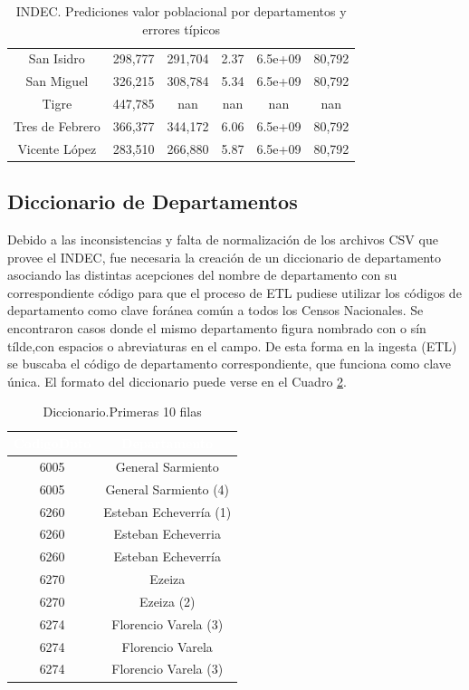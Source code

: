 \documentclass{article}
\theoremstyle{mytheoremstyle}
\theoremstyle{mytheoremstyle}
\theoremstyle{myproblemstyle}
\begin{document}
\begin{table}[htb!]
\begin{tabular}{|c|c|c|c|c|c|}
      San Isidro & 298,777 & 291,704 & 2.37 & 6.5e+09 & 80,792 \\
      San Miguel & 326,215 & 308,784 & 5.34 & 6.5e+09 & 80,792 \\
      Tigre & 447,785 & nan & nan & nan & nan \\
      Tres de Febrero & 366,377 & 344,172 & 6.06 & 6.5e+09 & 80,792 \\
      Vicente López & 283,510 & 266,880 & 5.87 & 6.5e+09 & 80,792 \\
      \hline
      \end{tabular}
      \caption{INDEC. Prediciones valor poblacional por departamentos y errores típicos}
      \label{tab:INResults}
\end{table}
      
\clearpage 
 \subsection{Diccionario de Departamentos } 
Debido a las inconsistencias y falta de normalización de los archivos CSV que provee el INDEC,
 fue necesaria la creación de un diccionario de departamento asociando las distintas acepciones del nombre de
  departamento con su correspondiente código para que el proceso de ETL pudiese utilizar los códigos de departamento 
  como clave foránea común a todos los Censos Nacionales.
  Se encontraron casos donde el mismo departamento figura nombrado con o sín tílde,con espacios o abreviaturas en el campo. \newline
  De esta forma en la ingesta (ETL) se buscaba el código de departamento correspondiente, que funciona como clave única.
   El formato del diccionario puede verse en el Cuadro \ref{tab:diccionario}.
\begin{table}[htb]
  \centering
  \begin{tabular}{|c|c|}
  \hline
  \textbf{\cellcolor[rgb]{0,0.231,0.427}\textcolor{white}{CodigoDpto}} & \textbf{\cellcolor[rgb]{0,0.231,0.427}\textcolor{white}{Departamento}} \\ \hline
  6005 & General Sarmiento \\
  6005 & General Sarmiento (4) \\
  6260 & Esteban Echeverría (1) \\
  6260 & Esteban Echeverria \\
  6260 & Esteban Echeverría \\
  6270 & Ezeiza \\
  6270 & Ezeiza (2) \\
  6274 & Florencio Varela (3)  \\
  6274 & Florencio Varela \\
  6274 & Florencio Varela (3)  \\
  \hline
  \end{tabular}
  \caption{Diccionario.Primeras 10 filas}
  \label{tab:diccionario}
  \end{table}
\end{document}
